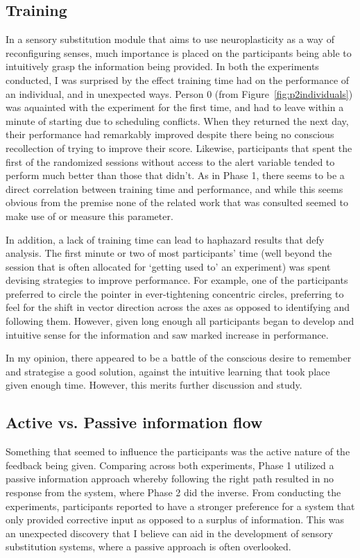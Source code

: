 \documentclass[
hidelinks,
12pt, %
oneside, %
english, %
doublespacing, %
headsepline, %
]{MastersDoctoralThesis} %
\begin{document}
\subsection{Training}

In a sensory substitution module that aims to use neuroplasticity as a way of reconfiguring senses, much importance is placed on the participants being able to intuitively grasp the information being provided. In both the experiments conducted, I was surprised by the effect training time had on the performance of an individual, and in unexpected ways. Person 0 (from Figure~\ref{fig:p2individuals}) was aquainted with the experiment for the first time, and had to leave within a minute of starting due to scheduling conflicts. When they returned the next day, their performance had remarkably improved despite there being no conscious recollection of trying to improve their score. Likewise, participants that spent the first of the randomized sessions without access to the alert variable tended to perform much better than those that didn't. As in Phase 1, there seems to be a direct correlation between training time and performance, and while this seems obvious from the premise none of the related work that was consulted seemed to make use of or measure this parameter.

In addition, a lack of training time can lead to haphazard results that defy analysis. The first minute or two of most participants' time (well beyond the session that is often allocated for `getting used to' an experiment) was spent devising strategies to improve performance. For example, one of the participants preferred to circle the pointer in ever-tightening concentric circles, preferring to feel for the shift in vector direction across the axes as opposed to identifying and following them. However, given long enough all participants began to develop and intuitive sense for the information and saw marked increase in performance.

In my opinion, there appeared to be a battle of the conscious desire to remember and strategise a good solution, against the intuitive learning that took place given enough time. However, this merits further discussion and study.

\subsection{Active vs. Passive information flow}

Something that seemed to influence the participants was the active nature of the feedback being given. Comparing across both experiments, Phase 1 utilized a passive information approach whereby following the right path resulted in no response from the system, where Phase 2 did the inverse. From conducting the experiments, participants reported to have a stronger preference for a system that only provided corrective input as opposed to a surplus of information. This was an unexpected discovery that I believe can aid in the development of sensory substitution systems, where a passive approach is often overlooked.
\end{document}
